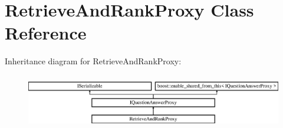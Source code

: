 \hypertarget{class_retrieve_and_rank_proxy}{}\section{Retrieve\+And\+Rank\+Proxy Class Reference}
\label{class_retrieve_and_rank_proxy}
Inheritance diagram for Retrieve\+And\+Rank\+Proxy\+:\begin{figure}[H]
\begin{center}
\leavevmode
\includegraphics[height=2.393162cm]{class_retrieve_and_rank_proxy}
\end{center}
\end{figure}
